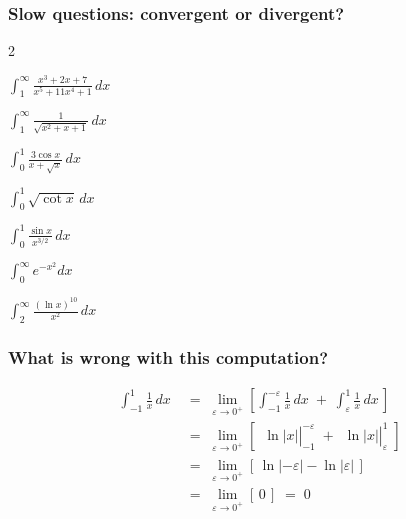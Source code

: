 \documentclass[14pt]{beamer}
\newcommand{\e}{\varepsilon}
\newcommand{\setsize}[1]{\fontsize{#1}{#1}\selectfont} %
\newcommand{\smallerfont}{\setsize{13}} %
\begin{document}
	\begin{frame}[t]
		\smallerfont
		\frametitle{Slow questions: convergent or divergent?}

		\begin{enumerate}
		\end{enumerate}
	\end{frame}

	\begin{frame}[t]
		\frametitle{What is wrong with this computation?}

		\[
			\begin{aligned}
				\int_{-1}^{1}\frac{1}{x}\, dx \; & = \; \lim_{\e \to 0^+}\left[ \int_{-1}^{-\e}\frac{1}{x}\, dx \; + \; \int_{\e}^{1}\frac{1}{x}\, dx \, \right]                                            \\
				\;                               & = \; \lim_{\e \to 0^+}\left[ \left. \phantom{\frac{1}{1}}\ln|x| \right\vert_{-1}^{-\e}\; + \left. \phantom{\frac{1}{1}}\ln|x| \right\vert_{\e}^{1}\; \right] \\
				\;                               & = \; \lim_{\e \to 0^+}\left[ \, \ln|-\e| - \ln |\e| \, \right] \phantom{\int}                                                                            \\
				\;                               & = \; \lim_{\e \to 0^+}\left[ \, 0 \, \right] \; = \; 0 \phantom{\int}
			\end{aligned}
		\]
	\end{frame}
\end{document}
